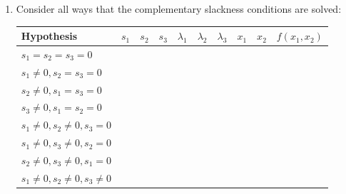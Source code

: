 \documentclass[
]{book}
\providecommand{\tightlist}{%
  \setlength{\itemsep}{0pt}\setlength{\parskip}{0pt}}
\theoremstyle{definition}
\theoremstyle{definition}
\theoremstyle{definition}
\theoremstyle{definition}
\theoremstyle{remark}
\begin{document}

\begin{enumerate}
\def\labelenumi{\arabic{enumi}.}
\setcounter{enumi}{3}
\tightlist
\item
  Consider all ways that the complementary slackness conditions are solved:

  \begin{center}
  \begin{tabular}{|l|cccccccc|c|}
  \hline
  Hypothesis & $s_1$ & $s_2$ & $s_3$ & $\lambda_1$ & $\lambda_2$ & $\lambda_3$ & $x_1$ & $x_2$ & $f(x_1, x_2)$\\
  \hline
  $s_1 = s_2 = s_3 = 0$ & \multicolumn{8}{l|}{\phantom{No solution}} & \\
  $s_1 \neq 0, s_2 = s_3 = 0$ & \phantom{2} & \phantom{0} & \phantom{0} & \phantom{0} & \phantom{0} & \phantom{0} & \phantom{0} & \phantom{0} & \phantom{0}\\
  $s_2 \neq 0, s_1 = s_3 = 0$ & \phantom{0} & \phantom{2} & \phantom{0} & \phantom{-8} & \phantom{0} & \phantom{-8} & \phantom{4} & \phantom{0} & \phantom{-16}\\
  $s_3 \neq 0, s_1 = s_2 = 0$ & \phantom{0} & \phantom{0} & \phantom{2} & \phantom{-16} & \phantom{-16} & \phantom{0} & \phantom{0} & \phantom{4} & \phantom{-32}\\
  $s_1 \neq 0, s_2 \neq 0, s_3 = 0$ &\multicolumn{8}{l|}{\phantom{No solution}} & \\
  $s_1 \neq 0, s_3 \neq 0, s_2 = 0$ &\multicolumn{8}{l|}{\phantom{No solution}} & \\
  $s_2 \neq 0, s_3 \neq 0, s_1 = 0$ &\phantom{0} & \phantom{$\sqrt{\frac{8}{3}}$} & \phantom{$\sqrt{\frac{4}{3}}$} & \phantom{$-\frac{16}{3}$} & \phantom{0} & \phantom{0} & \phantom{$\frac{8}{3}$}& \phantom{$\frac{4}{3}$} & \phantom{$-\frac{32}{3}$}\\
  $s_1 \neq 0, s_2 \neq 0, s_3 \neq 0$ &\multicolumn{8}{l|}{\phantom{No solution}}& \\
  \hline
  \end{tabular}
  \end{center}
\end{enumerate}
\end{document}
